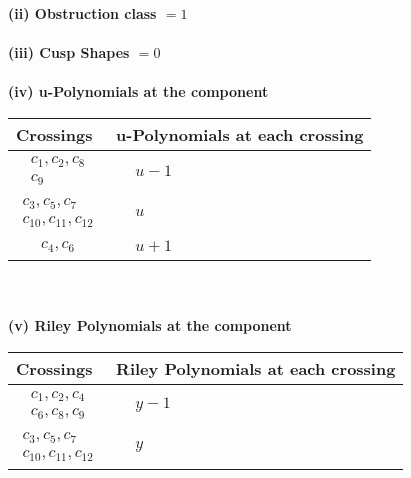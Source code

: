 \documentclass[1p]{elsarticle_modified}
\theoremstyle{definition}
\begin{document}
\flushleft \textbf{(ii) Obstruction class $= 1$}\\~\\
\flushleft \textbf{(iii) Cusp Shapes $= 0$}\\~\\
\newpage\renewcommand{\arraystretch}{1}
\flushleft \textbf{(iv) u-Polynomials at the component}\newline \\
\begin{tabular}{m{50pt}|m{274pt}}
Crossings & \hspace{64pt}u-Polynomials at each crossing \\
\hline $$\begin{aligned}c_{1},c_{2},c_{8}\\c_{9}\end{aligned}$$&$\begin{aligned}
&u-1
\end{aligned}$\\
\hline $$\begin{aligned}c_{3},c_{5},c_{7}\\c_{10},c_{11},c_{12}\end{aligned}$$&$\begin{aligned}
&u
\end{aligned}$\\
\hline $$\begin{aligned}c_{4},c_{6}\end{aligned}$$&$\begin{aligned}
&u+1
\end{aligned}$\\
\hline
\end{tabular}\\~\\
\newpage\renewcommand{\arraystretch}{1}
\flushleft \textbf{(v) Riley Polynomials at the component}\newline \\
\begin{tabular}{m{50pt}|m{274pt}}
Crossings & \hspace{64pt}Riley Polynomials at each crossing \\
\hline $$\begin{aligned}c_{1},c_{2},c_{4}\\c_{6},c_{8},c_{9}\end{aligned}$$&$\begin{aligned}
&y-1
\end{aligned}$\\
\hline $$\begin{aligned}c_{3},c_{5},c_{7}\\c_{10},c_{11},c_{12}\end{aligned}$$&$\begin{aligned}
&y
\end{aligned}$\\
\hline
\end{tabular}\\~\\
\end{document}
